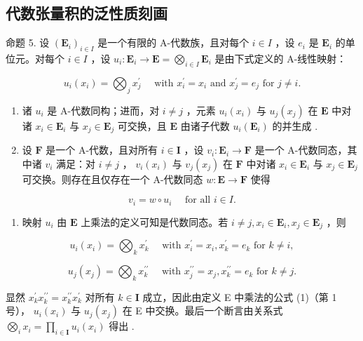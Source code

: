 \subsection{代数张量积的泛性质刻画}

命题 5. 设 \((\mathbf{E}_i)_{i\in I}\) 是一个有限的 A-代数族，且对每个 \(i\in I\) ，设 \(e_i\) 是 \(\mathbf{E}_i\) 的单位元。对每个 \(i\in I\) ，设 \(u_i: \mathbf{E}_i \to \mathbf{E} = \bigotimes_{i\in I} \mathbf{E}_i\) 是由下式定义的 A-线性映射：

\[
u _ {i} (x _ {i}) = \bigotimes_ {j} x _ {j} ^ {\prime} \quad \text { with } x _ {i} ^ {\prime} = x _ {i} \text { and } x _ {j} ^ {\prime} = e _ {j} \text { for } j \neq i.
\]

\begin{enumerate}
\def\labelenumi{(\roman{enumi})}
\item
  诸 \(u_{i}\) 是 A-代数同构；进而，对 \(i \neq j\) ，元素 \(u_{i}(x_{i})\) 与 \(u_{j}(x_{j})\) 在 \(\mathbf{E}\) 中对诸 \(x_{i} \in \mathbf{E}_{i}\) 与 \(x_{j} \in \mathbf{E}_{j}\) 可交换，且 \(\mathbf{E}\) 由诸子代数 \(u_{i}(\mathbf{E}_{i})\) 的并生成 .
\item
  设 \(\mathbf{F}\) 是一个 A-代数，且对所有 \(i \in \mathbf{I}\) ，设 \(v_i: \mathbf{E}_i \to \mathbf{F}\) 是一个 A-代数同态，其中诸 \(v_i\) 满足：对 \(i \neq j\) ， \(v_i(x_i)\) 与 \(v_j(x_j)\) 在 \(\mathbf{F}\) 中对诸 \(x_i \in \mathbf{E}_i\) 与 \(x_j \in \mathbf{E}_j\) 可交换。则存在且仅存在一个 A-代数同态 \(w: \mathbf{E} \to \mathbf{F}\) 使得
\end{enumerate}

\[
v _ {i} = w \circ u _ {i} \quad \text { for all } i \in I.\tag{4}
\]

\begin{enumerate}
\def\labelenumi{(\roman{enumi})}
\tightlist
\item
  映射 \(u_{i}\) 由 \(\mathbf{E}\) 上乘法的定义可知是代数同态。若 \(i \neq j, x_{i} \in \mathbf{E}_{i}, x_{j} \in \mathbf{E}_{j}\) ，则
\end{enumerate}

\[
u _ {i} (x _ {i}) = \bigotimes_ {k} x _ {k} ^ {\prime} \quad \text { with } x _ {i} ^ {\prime} = x _ {i}, x _ {k} ^ {\prime} = e _ {k} \text { for } k \neq i,
\]

\[
u _ {j} (x _ {j}) = \bigotimes_ {k} x _ {k} ^ {\prime \prime} \quad \text { with } x _ {j} ^ {\prime \prime} = x _ {j}, x _ {k} ^ {\prime \prime} = e _ {k} \text { for } k \neq j.
\]

显然 \(x_{k}^{\prime}x_{k}^{\prime \prime} = x_{k}^{\prime \prime}x_{k}^{\prime}\) 对所有 \(k\in \mathbf{I}\) 成立，因此由定义 E 中乘法的公式 (1)（第 1 号）， \(u_{i}(x_{i})\) 与 \(u_{j}(x_{j})\) 在 E 中交换。最后一个断言由关系式 \(\bigotimes_{i}x_{i} = \prod_{i\in \mathbf{I}}u_{i}(x_{i})\) 得出 .

